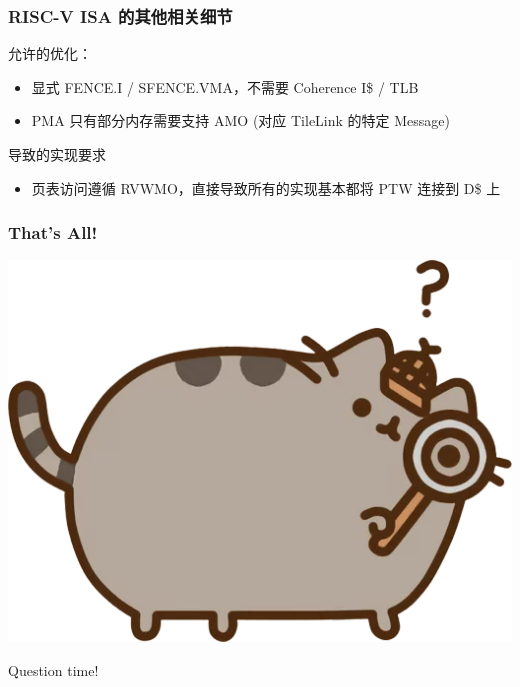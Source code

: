 \documentclass[UTF-8]{ctexbeamer}
\begin{document}
\begin{frame}
  \frametitle{RISC-V ISA 的其他相关细节}

  允许的优化：
  \begin{itemize}
    \item 显式 FENCE.I / SFENCE.VMA，不需要 Coherence I\$ / TLB
    \item PMA 只有部分内存需要支持 AMO (对应 TileLink 的特定 Message)
  \end{itemize}

  导致的实现要求
  \begin{itemize}
    \item 页表访问遵循 RVWMO，直接导致所有的实现基本都将 PTW 连接到 D\$ 上
  \end{itemize}
\end{frame}

\begin{frame}
  \frametitle{That's All!}

  \begin{center}

    \includegraphics[width=.5\textwidth]{assets/look.png}

    Question time!
  \end{center}
\end{frame}
\end{document}
